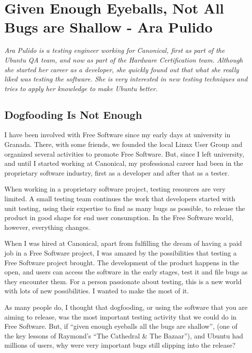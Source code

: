 \chapter{Given Enough Eyeballs, Not All Bugs are Shallow - Ara Pulido}

\textit{Ara Pulido is a testing engineer working for Canonical, first as part of
the Ubuntu QA team, and now as part of the Hardware Certification team. Although
she started her career as a developer, she quickly found out that what she
really liked was testing the software. She is very interested in new testing
techniques and tries to apply her knowledge to make Ubuntu better.}

\section*{Dogfooding Is Not Enough} 

I have been involved with Free Software since my early days at university in
Granada. There, with some friends, we founded the local Linux User
Group and organized several activities to
promote Free Software. But, since I left university, and until I started working
at Canonical, my professional career had been in the proprietary software
industry, first as a developer and after that as a tester.

When working in a proprietary software project, testing resources are very
limited. A small testing team continues the work that developers started with
unit testing, using their expertise to find as many bugs as possible, to release
the product in good shape for end user consumption. In the Free Software world,
however, everything changes.

When I was hired at Canonical, apart from fulfilling the dream of having a paid
job in a Free Software project, I was amazed by the possibilities that testing a
Free Software project brought. The development of the product happens in the
open, and users can access the software in the early stages, test it and file
bugs as they encounter them. For a person passionate about testing, this is a new
world with lots of new possibilities. I wanted to make the most of it.

As many people do, I thought that dogfooding, or using the software that you are
aiming to release, was the most important testing activity that we could do in
Free Software. But, if ``given enough eyeballs all the bugs are shallow'', (one of
the key lessons of Raymond's ``The Cathedral \& The Bazaar''), and Ubuntu had
millions of users, why were very important bugs still slipping into the release?


